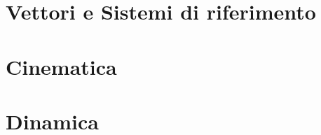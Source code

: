 \documentclass[a4paper, titlepage]{report}%
\theoremstyle{definition} %
\theoremstyle{plain}
\theoremstyle{plain}
\theoremstyle{remark}
\theoremstyle{remark}
\begin{document}
    
\section{Vettori e Sistemi di riferimento}

    

\section{Cinematica}
    
    

\section{Dinamica}


\end{document}
